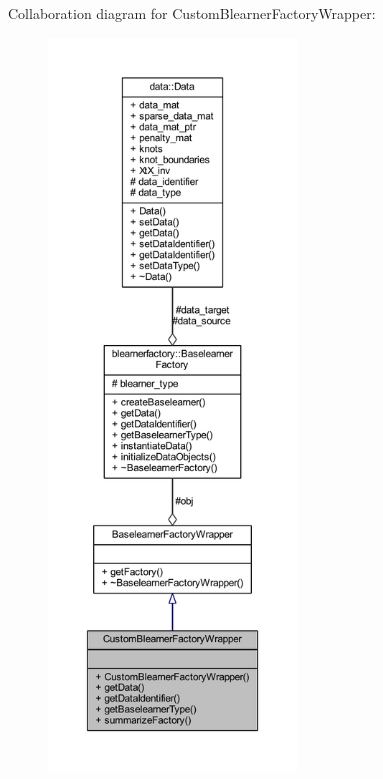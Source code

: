 Collaboration diagram for Custom\+Blearner\+Factory\+Wrapper\+:\nopagebreak
\begin{figure}[H]
\begin{center}
\leavevmode
\includegraphics[height=550pt]{class_custom_blearner_factory_wrapper__coll__graph}
\end{center}
\end{figure}
